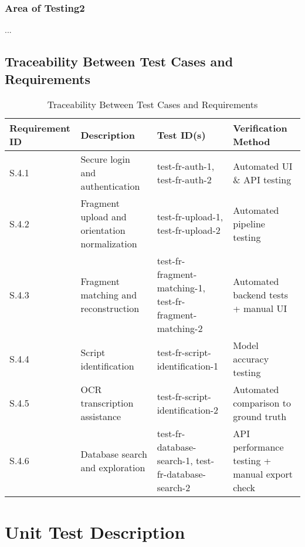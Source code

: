 \documentclass[12pt, titlepage]{article}
\begin{document}
\subsubsection{Area of Testing2}

...

\subsection{Traceability Between Test Cases and Requirements}

\begin{table}[ht]
\centering
\begin{tabular}{|p{3cm}|p{5cm}|p{3cm}|p{3cm}|}
\hline
\textbf{Requirement ID} & \textbf{Description} & \textbf{Test ID(s)} & \textbf{Verification Method} \\
\hline
S.4.1 & Secure login and authentication & test-fr-auth-1, test-fr-auth-2 & Automated UI \& API testing \\
\hline
S.4.2 & Fragment upload and orientation normalization & test-fr-upload-1, test-fr-upload-2 & Automated pipeline testing \\
\hline
S.4.3 & Fragment matching and reconstruction & test-fr-fragment-matching-1, test-fr-fragment-matching-2 & Automated backend tests + manual UI \\
\hline
S.4.4 & Script identification & test-fr-script-identification-1 & Model accuracy testing \\
\hline
S.4.5 & OCR transcription assistance & test-fr-script-identification-2 & Automated comparison to ground truth \\
\hline
S.4.6 & Database search and exploration & test-fr-database-search-1, test-fr-database-search-2 & API performance testing + manual export check \\
\hline
\end{tabular}
\caption{Traceability Between Test Cases and Requirements}
\end{table}

\section{Unit Test Description}


\end{document}
